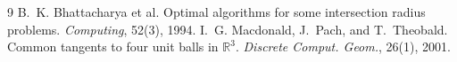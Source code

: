 \documentclass[10pt]{hackr26}
\newcommand{\R}{\mathbb{R}}
\begin{document}
\scriptsize
\setlength{\parskip}{0pt}
\begin{thebibliography}{9}
\setlength{\itemsep}{0pt}
 B.~K. Bhattacharya et al. Optimal algorithms for some intersection radius problems. \emph{Computing}, 52(3), 1994.
 I.~G. Macdonald, J.~Pach, and T.~Theobald. Common tangents to four unit balls in $\R^3$. \emph{Discrete Comput. Geom.}, 26(1), 2001.
\end{thebibliography}
\end{document}
